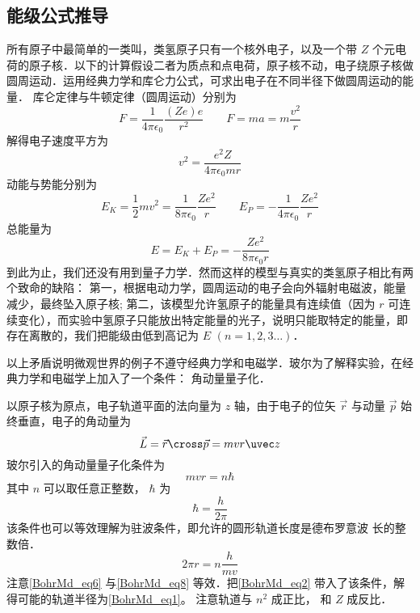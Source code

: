 \subsection{能级公式推导}
所有原子中最简单的一类叫，类氢原子只有一个核外电子，以及一个带 $Z$ 个元电荷的原子核．以下的计算假设二者为质点和点电荷，原子核不动，电子绕原子核做圆周运动．运用经典力学和库仑力公式，可求出电子在不同半径下做圆周运动的能量． 库仑定律与牛顿定律（圆周运动）分别为
\begin{equation}
F = \frac{1}{4\pi \epsilon_0} \frac{(Ze)e}{r^2}
\qquad
F = ma = m\frac{v^2}{r}
\end{equation}
解得电子速度平方为
\begin{equation}\label{BohrMd_eq2}
v^2 = \frac{e^2 Z}{4\pi \epsilon_0 mr}
\end{equation}
动能与势能分别为
\begin{equation}
E_K = \frac12 m v^2 = \frac{1}{8\pi\epsilon_0} \frac{Z e^2}{r}
\qquad
E_P =  -\frac{1}{4\pi\epsilon_0} \frac{Ze^2}{r}
\end{equation}   
总能量为
\begin{equation}\label{BohrMd_eq4}
E = E_K + E_P =  -\frac{Z e^2}{8\pi\epsilon_0 r}
\end{equation}
到此为止，我们还没有用到量子力学．然而这样的模型与真实的类氢原子相比有两个致命的缺陷： 第一，根据电动力学，圆周运动的电子会向外辐射电磁波，能量减少，最终坠入原子核; 第二，该模型允许氢原子的能量具有连续值（因为 $r$ 可连续变化），而实验中氢原子只能放出特定能量的光子，说明只能取特定的能量，即存在离散的，我们把能级由低到高记为 $E$  $(n = 1,2,3\dots)$． 

以上矛盾说明微观世界的例子不遵守经典力学和电磁学．玻尔为了解释实验，在经典力学和电磁学上加入了一个条件： 角动量量子化．

以原子核为原点，电子轨道平面的法向量为 $z$ 轴，由于电子的位矢 $\vec r$ 与动量 $\vec p$ 始终垂直，电子的角动量为
\begin{equation}
\vec L = \vec r \cross \vec p = mvr \uvec z
\end{equation}
玻尔引入的角动量量子化条件为
\begin{equation}\label{BohrMd_eq6}
mvr = n\hbar 
\end{equation}
其中 $n$ 可以取任意正整数， $\hbar$ 为
\begin{equation}\label{BohrMd_eq7}
\hbar  = \frac{h}{2\pi}
\end{equation}
该条件也可以等效理解为驻波条件，即允许的圆形轨道长度是德布罗意波%
长的整数倍．
\begin{equation}\label{BohrMd_eq8}
2\pi r  = n \frac{h}{mv}
\end{equation}
注意\autoref{BohrMd_eq6} 与\autoref{BohrMd_eq8} 等效．把\autoref{BohrMd_eq2} 带入了该条件，解得可能的轨道半径为\autoref{BohrMd_eq1}。 注意轨道与 $n^2$ 成正比， 和 $Z$ 成反比．

